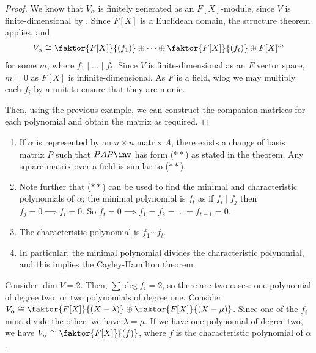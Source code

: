 \begin{proof}
	We know that $V_\alpha$ is finitely generated as an $F[X]$-module, since $V$ is finite-dimensional by .
	Since $F[X]$ is a Euclidean domain, the structure theorem applies, and
	\begin{align*}
		V_\alpha \cong \faktor{F[X]}{(f_1)} \oplus \dots \oplus \faktor{F[X]}{(f_t)} \oplus F[X]^m
	\end{align*}
	for some $m$, where $f_1 \mid \dots \mid f_t$.
	Since $V$ is finite-dimensional as an $F$ vector space, $m = 0$ as $F[X]$ is infinite-dimensional.
	As $F$ is a field, wlog we may multiply each $f_i$ by a unit to ensure that they are monic.

	Then, using the previous example, we can construct the companion matrices for each polynomial and obtain the matrix as required.
\end{proof}

\begin{remark}
	\begin{enumerate}
		\item If $\alpha$ is represented by an $n \times n$ matrix $A$, there exists a change of basis matrix $P$ such that $PAP\inv$ has form ($\ast\ast$) as stated in the theorem.
		Any square matrix over a field is similar to ($\ast\ast$).
		\item Note further that (\(\ast\ast\)) can be used to find the minimal and characteristic polynomials of $\alpha$; the minimal polynomial is $f_t$ as if $f_i \mid f_j$ then $f_j = 0 \implies f_i = 0$.
		So $f_t = 0 \implies f_1 = f_2 = \dots = f_{t - 1} = 0$.
		\item The characteristic polynomial is $f_1 \cdots f_t$.
		\item In particular, the minimal polynomial divides the characteristic polynomial, and this implies the Cayley-Hamilton theorem.
	\end{enumerate} 
\end{remark}

\begin{example}
	Consider $\dim V = 2$.
	Then, $\sum \deg f_i = 2$, so there are two cases: one polynomial of degree two, or two polynomials of degree one.
	Consider $V_\alpha \cong \faktor{F[X]}{(X-\lambda)} \oplus \faktor{F[X]}{(X-\mu)}$.
	Since one of the $f_i$ must divide the other, we have $\lambda = \mu$.
	If we have one polynomial of degree two, we have $V_\alpha \cong \faktor{F[X]}{(f)}$, where $f$ is the characteristic polynomial of $\alpha$.
\end{example}

